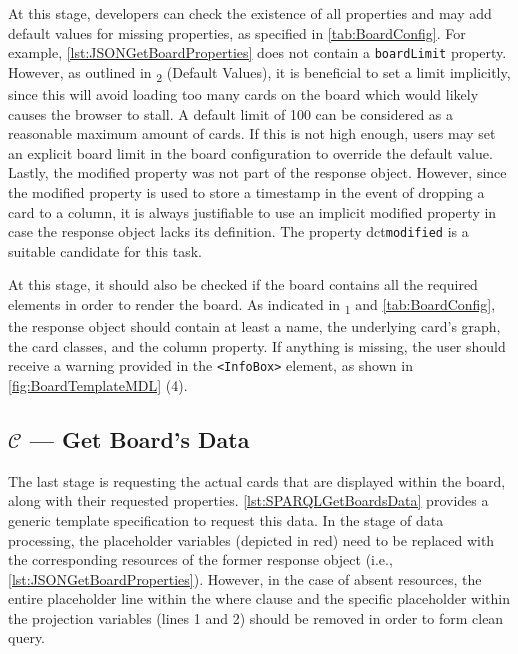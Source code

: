 \noindent At this stage, developers can check the existence of all properties and may add default values for missing properties, as specified in \autoref{tab:BoardConfig}. For example, \autoref{lst:JSONGetBoardProperties} does not contain a \texttt{boardLimit} property. However, as outlined in \textsubscript{2} (Default Values), it is beneficial to set a limit implicitly, since this will avoid loading too many cards on the board which would likely causes the browser to stall. A default limit of 100 can be considered as a reasonable maximum amount of cards. If this is not high enough, users may set an explicit board limit in the board configuration to override the default value. Lastly, the modified property was not part of the response object. However, since the modified property is used to store a timestamp in the event of dropping a card to a column, it is always justifiable to use an implicit modified property in case the response object lacks its definition. The property   \acrshort{dct}\texttt{modified} is a suitable candidate for this task.

At this stage, it should also be checked if the board contains all the required elements in order to render the board. As indicated in \textsubscript{1} and \autoref{tab:BoardConfig}, the response object should contain at least a name, the underlying card’s graph, the card classes, and the column property. If anything is missing, the user should receive a warning provided in the \texttt{<InfoBox>} element, as shown in \autoref{fig:BoardTemplateMDL} (4).




\subsection[C — Get Board’s Data]{\(\mathcal{C}\) — Get Board’s Data}\label{ssec:QS-C}

The last stage is requesting the actual cards that are displayed within the board, along with their requested properties. \autoref{lst:SPARQLGetBoardsData} provides a generic template specification to request this data. In the stage of data processing, the placeholder variables (depicted in red) need to be replaced with the corresponding resources of the former response object (i.e., \autoref{lst:JSONGetBoardProperties}). However, in the case of absent resources, the entire placeholder line within the where clause and the specific placeholder within the projection variables (lines 1 and 2) should be removed in order to form clean query.

